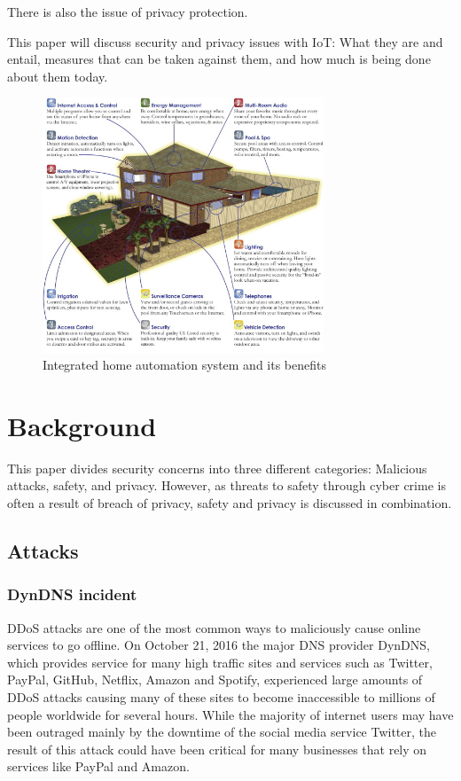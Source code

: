 \documentclass[a4paper, conference]{IEEEtran/IEEEtran}
\begin{document}
There is also the issue of privacy protection.

This paper will discuss security and privacy issues with IoT\@: What they are and entail, measures that can be taken against them, and how much is being done about them today.

\begin{figure}[!t]
\centering
\includegraphics[width=3.3in]{assets/raspberry.jpg}
\caption{Integrated home automation system and its benefits}
\label{fig:raspberry}
\end{figure}

\section{Background}
This paper divides security concerns into three different categories: Malicious attacks, safety, and privacy. However, as threats to safety through cyber crime is often a result of breach of privacy, safety and privacy is discussed in combination. 

\subsection{Attacks}
\subsubsection{DynDNS incident}
DDoS attacks are one of the most common ways to maliciously cause online services to go offline. On October 21, 2016 the major DNS provider DynDNS, which provides service for many high traffic sites and services such as Twitter, PayPal, GitHub, Netflix, Amazon and Spotify, experienced large amounts of DDoS attacks causing many of these sites to become inaccessible to millions of people worldwide for several hours.\cite{dynstatement} While the majority of internet users may have been outraged mainly by the downtime of the social media service Twitter, the result of this attack could have been critical for many businesses that rely on services like PayPal and Amazon.
\end{document}
